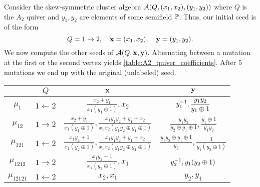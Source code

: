 \begin{example}

	Consider the skew-symmetric cluster algebra $\mathcal{A}(Q, (x_1, x_2), (y_1, y_2))$ where $Q$
	is the $A_2$ quiver and $y_1, y_2$ are elements of some semifield $\mathbb{P}$. Thus, our
	initial seed is of the form
	\begin{equation*}
		Q = 1 \to 2, \quad \mathbf{x} = (x_1, x_2), \quad \mathbf{y} = (y_1, y_2).
	\end{equation*}
	We now compute the other seeds of $\mathcal{A}(Q, \mathbf{x}, \mathbf{y})$. Alternating between a mutation
	at the first or the second vertex yields \cref{table:A2_quiver_coefficients}. After $5$
	mutations we end up with the original (unlabeled) seed.
	\begin{table}[ht!]
		\centering
		\bgroup
		\renewcommand{\arraystretch}{2.5}
		\begin{tabular}{c|c|c|c}
			              & $\displaystyle Q$         & $\displaystyle \mathbf{x}$                                                                                                     & $\displaystyle \mathbf{y}$                                                                \\
			\hline
			$\mu_1$       & $\displaystyle 1 \gets 2$ & $\displaystyle \frac{x_2 + y_1}{x_1(y_1 \oplus 1)}, x_2$                                                                & $\displaystyle y_1^{-1}, \frac{y_1y_2}{y_1 \oplus 1}$                               \\[5pt]
			\hline
			$\mu_{12}$    & $\displaystyle 1 \to 2$   & $\displaystyle \frac{x_2 + y_1}{x_1(y_1 \oplus 1)}, \frac{x_1 y_1 y_2 + y_1 + x_2}{x_1x_2(y_1y_2\oplus y_1 \oplus 1)}$  & $\displaystyle \frac{y_1y_2}{y_2\oplus y_1\oplus 1}, \frac{y_1 \oplus 1}{y_1 y_2}$ \\[5pt]
			\hline
			$\mu_{121}$   & $\displaystyle 1 \gets 2$ & $\displaystyle \frac{x_1y_2 + 1}{x_1(y_2 \oplus 1)}, \frac{x_1 y_1 y_2 + y_1 + x_2}{x_1x_2(y_1y_2\oplus y_1 \oplus 1)}$ & $\displaystyle \frac{y_1y_2\oplus y_1\oplus 1}{y_2}, \frac{1}{y_1(y_2 \oplus 1)}$  \\[5pt]
			\hline
			$\mu_{1212}$  & $\displaystyle 1 \to 2$   & $\displaystyle \frac{x_1y_2 + 1}{x_2(y_2 \oplus 1)},x_1$                                                                & $\displaystyle y_2^{-1}, y_1(y_2 \oplus 1)$                                         \\[5pt]
			\hline
			$\mu_{12121}$ & $\displaystyle 1 \gets 2$ & $\displaystyle x_2,x_1$                                                                                                 & $\displaystyle y_2, y_1$
		\end{tabular}
		\egroup


\end{table}
\end{example}
